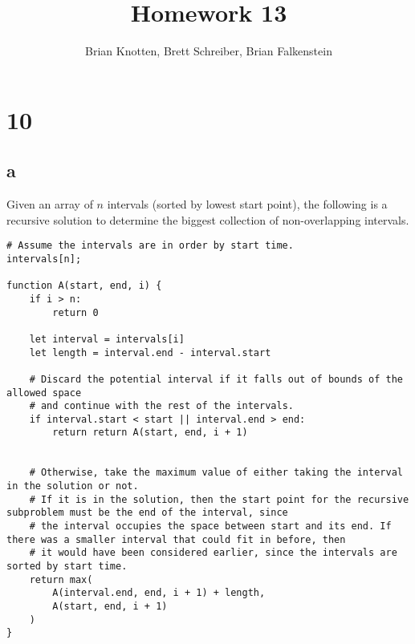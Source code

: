 \documentclass[letterpaper,notitlepage,twoside]{article}
\begin{document}
\title{Homework 13}
\author{Brian Knotten, Brett Schreiber, Brian Falkenstein}
\maketitle

\section*{10}
\subsection*{a}
Given an array of $n$ intervals (sorted by lowest start point), the following is a recursive solution to determine the biggest collection of non-overlapping intervals.
\begin{verbatim}
# Assume the intervals are in order by start time.
intervals[n];

function A(start, end, i) {
    if i > n:
        return 0
    
    let interval = intervals[i]
    let length = interval.end - interval.start
   
    # Discard the potential interval if it falls out of bounds of the allowed space
    # and continue with the rest of the intervals.
    if interval.start < start || interval.end > end:
        return return A(start, end, i + 1)
    
    
    # Otherwise, take the maximum value of either taking the interval in the solution or not.
    # If it is in the solution, then the start point for the recursive subproblem must be the end of the interval, since
    # the interval occupies the space between start and its end. If there was a smaller interval that could fit in before, then
    # it would have been considered earlier, since the intervals are sorted by start time.
    return max(
        A(interval.end, end, i + 1) + length,
        A(start, end, i + 1)
    )
}
\end{verbatim}
\end{document}
